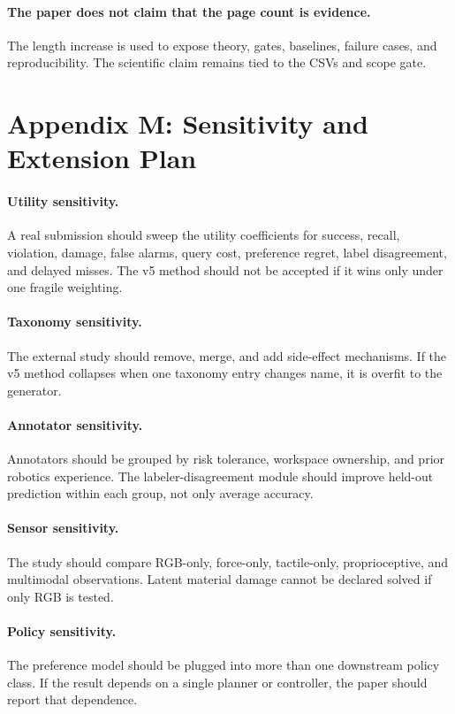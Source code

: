 \documentclass{article}
\begin{document}
\paragraph{The paper does not claim that the page count is evidence.}
The length increase is used to expose theory, gates, baselines, failure cases, and reproducibility. The scientific claim remains tied to the CSVs and scope gate.

\clearpage
\section*{Appendix M: Sensitivity and Extension Plan}
\paragraph{Utility sensitivity.}
A real submission should sweep the utility coefficients for success, recall, violation, damage, false alarms, query cost, preference regret, label disagreement, and delayed misses. The v5 method should not be accepted if it wins only under one fragile weighting.

\paragraph{Taxonomy sensitivity.}
The external study should remove, merge, and add side-effect mechanisms. If the v5 method collapses when one taxonomy entry changes name, it is overfit to the generator.

\paragraph{Annotator sensitivity.}
Annotators should be grouped by risk tolerance, workspace ownership, and prior robotics experience. The labeler-disagreement module should improve held-out prediction within each group, not only average accuracy.

\paragraph{Sensor sensitivity.}
The study should compare RGB-only, force-only, tactile-only, proprioceptive, and multimodal observations. Latent material damage cannot be declared solved if only RGB is tested.

\paragraph{Policy sensitivity.}
The preference model should be plugged into more than one downstream policy class. If the result depends on a single planner or controller, the paper should report that dependence.
\end{document}
